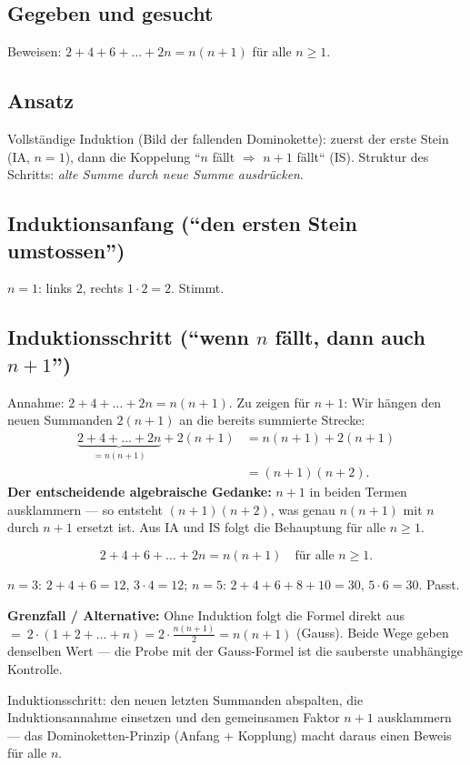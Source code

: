 

\subsection*{Gegeben und gesucht}
Beweisen: $2+4+6+\dots+2n=n(n+1)$ für alle $n\ge1$.

\subsection*{Ansatz}
Vollständige Induktion (Bild der fallenden Dominokette): zuerst der
erste Stein (IA, $n=1$), dann die Koppelung ``$n$ f\"allt $\Rightarrow$
$n+1$ f\"allt`` (IS). Struktur des Schritts: \emph{alte Summe durch neue
Summe ausdr\"ucken}.

\subsection*{Induktionsanfang (``den ersten Stein umstossen'')}
$n=1$: links $2$, rechts $1\cdot2=2$. Stimmt. \checkmark

\subsection*{Induktionsschritt (``wenn $n$ f\"allt, dann auch $n+1$'')}
Annahme: $2+4+\dots+2n=n(n+1)$. Zu zeigen für $n+1$: Wir hängen den
neuen Summanden $2(n+1)$ an die bereits summierte Strecke:
\begin{align}
  \underbrace{2+4+\dots+2n}_{=n(n+1)}+2(n+1)
  &=n(n+1)+2(n+1) \\
  &=(n+1)(n+2). \tag*{$\checkmark$}
\end{align}
\textbf{Der entscheidende algebraische Gedanke:} $n+1$ in beiden Termen
ausklammern --- so entsteht $(n+1)(n+2)$, was genau $n(n+1)$ mit $n$
durch $n+1$ ersetzt ist. Aus IA und IS folgt die Behauptung für alle
$n\ge1$.

\begin{ergebnis}
\begin{equation*}
  2+4+6+\dots+2n= n(n+1)\quad\text{für alle } n\ge1 .
\end{equation*}
\end{ergebnis}

\begin{kontrolle}
$n=3$: $2+4+6=12$, $3\cdot4=12$; $n=5$: $2+4+6+8+10=30$, $5\cdot6=30$.
Passt.

\textbf{Grenzfall / Alternative:} Ohne Induktion folgt die Formel direkt
aus $=\ 2\cdot(1+2+\dots+n)=2\cdot\frac{n(n+1)}2=n(n+1)$ (Gauss). Beide
Wege geben denselben Wert --- die Probe mit der Gauss-Formel ist die
sauberste unabh\"angige Kontrolle.
\end{kontrolle}

\begin{merksatz}
Induktionsschritt: den neuen letzten Summanden abspalten, die
Induktionsannahme einsetzen und den gemeinsamen Faktor $n+1$
ausklammern --- das Dominoketten-Prinzip (Anfang + Kopplung) macht daraus
einen Beweis für alle $n$.
\end{merksatz}
